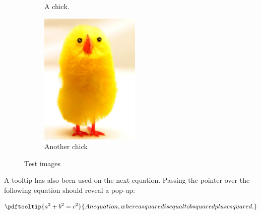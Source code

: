 \documentclass[10pt,onecolumn]{article}
\begin{document}
\begin{figure}
          \begin{subfigure}[b]{.55\linewidth}
            \centering
		{}
            \caption{A chick.}\label{fig:ChickWithAltText}
          \end{subfigure}%
          \begin{subfigure}[b]{.55\linewidth}
            \centering
		\includegraphics[height=2.5in]{Chick1}
            \caption{Another chick}\label{fig:ChickWithAltText2}
          \end{subfigure}
          \caption{Test images}
          \label{fig:AltTextImages}
\end{figure}

A tooltip has also been used on the next equation. Passing the pointer over the following equation should reveal a pop-up:

\begin{equation}
	{\pdftooltip{a^2+b^2=c^2}{An equation, where a squared is equal to b squared plus c squared.}}
\end{equation}
\end{document}
